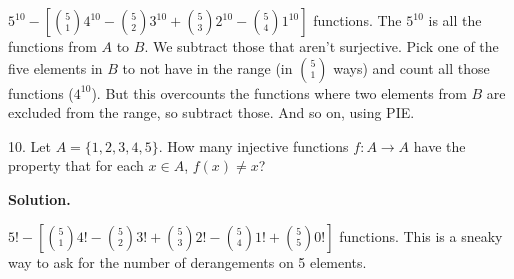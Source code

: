 \documentclass[10pt,]{book}
\theoremstyle{plain}
\theoremstyle{definition}
\theoremstyle{definition}
\theoremstyle{definition}
\numberwithin{equation}{section}
\begin{document}
\begin{exerciselist}
      \(5^{10} - \left[{5 \choose 1}4^{10} - {5 \choose 2}3^{10} + {5 \choose 3}2^{10} - {5 \choose 4}1^{10}\right]\) functions.  The \(5^{10}\) is all the functions from \(A\) to \(B\).  We subtract those that aren't surjective.  Pick one of the five elements in \(B\) to not have in the range (in \({5 \choose 1}\) ways) and count all those functions (\(4^{10}\)).  But this overcounts the functions where two elements from \(B\) are excluded from the range, so subtract those.  And so on, using PIE.
\item[10.]\hypertarget{exercise-101}{}
      Let \(A = \{1,2,3,4,5\}\). How many injective functions \(f:A \to A\) have the property that for each \(x \in A\), \(f(x) \ne x\)?
\par\smallskip
\par\smallskip
\noindent\textbf{Solution.}\hypertarget{solution-152}{}\quad

      \(5! - \left[{5 \choose 1}4! - {5 \choose 2}3! + {5 \choose 3}2! - {5 \choose 4}1! + {5 \choose 5}0!\right]\) functions. This is a sneaky way to ask for the number of derangements on 5 elements.
\end{exerciselist}
\typeout{************************************************}
\typeout{************************************************}
\end{document}
